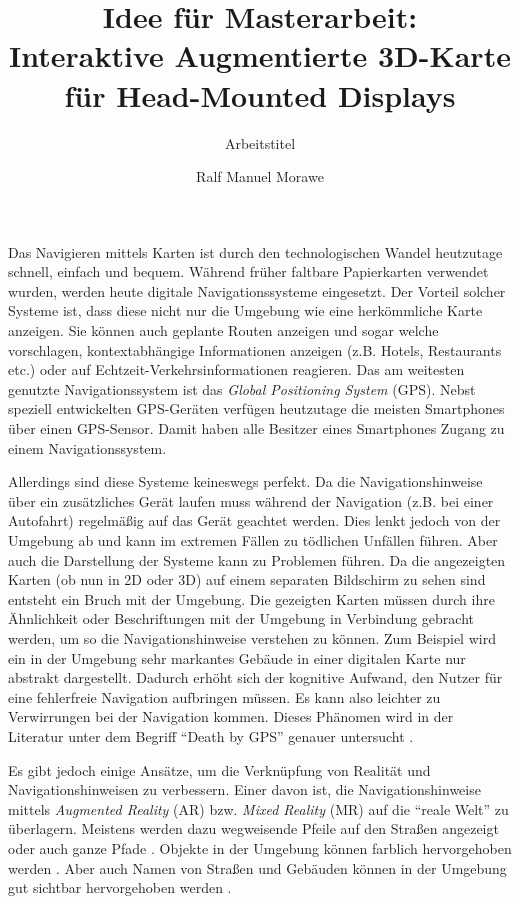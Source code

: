 \documentclass[a4paper]{scrartcl}
\begin{document}
	
\author{Ralf Manuel Morawe}
\title{Idee für Masterarbeit:\\ Interaktive Augmentierte 3D-Karte für Head-Mounted Displays}
\subtitle{Arbeitstitel}
\maketitle

Das Navigieren mittels Karten ist durch den technologischen Wandel heutzutage schnell, einfach und bequem.
Während früher faltbare Papierkarten verwendet wurden, werden heute digitale Navigationssysteme eingesetzt.
Der Vorteil solcher Systeme ist, dass diese nicht nur die Umgebung wie eine herkömmliche Karte anzeigen.
Sie können auch geplante Routen anzeigen und sogar welche vorschlagen, kontextabhängige Informationen anzeigen (z.B. Hotels, Restaurants etc.) oder auf Echtzeit-Verkehrsinformationen reagieren.
Das am weitesten genutzte Navigationssystem ist das \emph{Global Positioning System} (GPS).
Nebst speziell entwickelten GPS-Geräten verfügen heutzutage die meisten Smartphones über einen GPS-Sensor.
Damit haben alle Besitzer eines Smartphones Zugang zu einem Navigationssystem.

Allerdings sind diese Systeme keineswegs perfekt.
Da die Navigationshinweise über ein zusätzliches Gerät laufen muss während der Navigation (z.B. bei einer Autofahrt) regelmäßig auf das Gerät geachtet werden.
Dies lenkt jedoch von der Umgebung ab und kann im extremen Fällen zu tödlichen Unfällen führen.
Aber auch die Darstellung der Systeme kann zu Problemen führen.
Da die angezeigten Karten (ob nun in 2D oder 3D) auf einem separaten Bildschirm zu sehen sind entsteht ein Bruch mit der Umgebung.
Die gezeigten Karten müssen durch ihre Ähnlichkeit oder Beschriftungen mit der Umgebung in Verbindung gebracht werden, um so die Navigationshinweise verstehen zu können.
Zum Beispiel wird ein in der Umgebung sehr markantes Gebäude in einer digitalen Karte nur abstrakt dargestellt.
Dadurch erhöht sich der kognitive Aufwand, den Nutzer für eine fehlerfreie Navigation aufbringen müssen.
Es kann also leichter zu Verwirrungen bei der Navigation kommen.
Dieses Phänomen wird in der Literatur unter dem Begriff \enquote{Death by GPS} genauer untersucht \autocite{Lin2017}.

Es gibt jedoch einige Ansätze, um die Verknüpfung von Realität und Navigationshinweisen zu verbessern.
Einer davon ist, die Navigationshinweise mittels \emph{Augmented Reality} (AR) bzw. \emph{Mixed Reality} (MR) auf die \enquote{reale Welt} zu überlagern.
Meistens werden dazu wegweisende Pfeile auf den Straßen angezeigt \autocites{bibid}{bibid} oder auch ganze Pfade \autocites{bibid}{bibid}.
Objekte in der Umgebung können farblich hervorgehoben werden \autocites{bibid}{bibid}.
Aber auch Namen von Straßen und Gebäuden können in der Umgebung gut sichtbar hervorgehoben werden \autocites{bibid}{bibid}.
\end{document}
